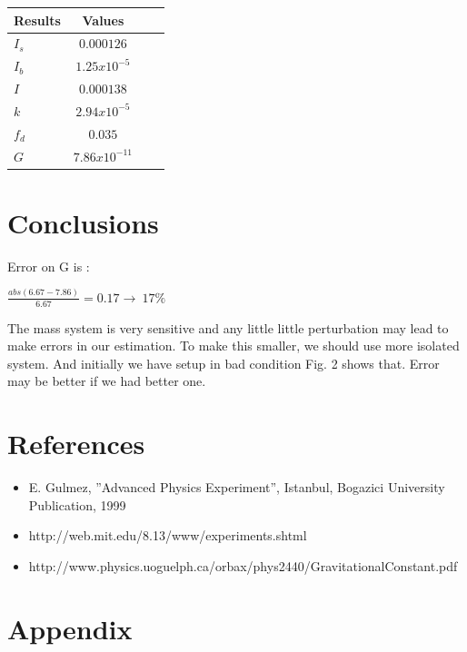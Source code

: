 \documentclass[aps,twocolumn,secnumarabic,nobalancelastpage,amsmath,amssymb,
nofootinbib]{revtex4}
\begin{document}
\begin{center}
\begin{table}[htbp]
\begin{tabular}{|l|c|c|r|}
\hline
{\small Results} & { \small Values } \\
\hline
${I}_{s}$& $0.000126$  \\
${I}_{b}$&  $1.25x10^{-5}$  \\
${I}$    &  $0.000138$  \\
${k}$    & $2.94x10^{-5}$   \\
${f}_{d}$& $0.035$   \\
${G}$& $7.86x10^{-11}$   \\



\hline
\end{tabular}

\end{table}
\end{center}



\section{Conclusions}
Error on G is : 
\begin{center}
$\frac{abs(6.67-7.86)}{6.67}=0.17 \rightarrow ~17\%$
\end{center}

The mass system is very sensitive and any little little perturbation may lead to make errors in our estimation. To make this smaller, we should use more isolated system. And initially we have setup in bad condition Fig. 2 shows that. Error may be better if we had better one. 


\section{References}
\begin{itemize}
\item E. Gulmez, ”Advanced Physics Experiment”, Istanbul, Bogazici University Publication, 1999
\item http://web.mit.edu/8.13/www/experiments.shtml
\item http://www.physics.uoguelph.ca/orbax/phys2440/GravitationalConstant.pdf
\end{itemize}

\section{Appendix}
\end{document}
